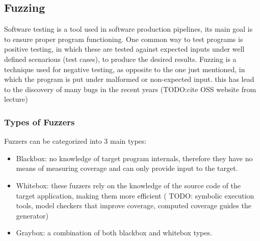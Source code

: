 





\subsection{Fuzzing}

Software testing is a tool used in software production pipelines, its main goal is to ensure proper program functioning. One common way to test programs is 
positive testing, in which these are tested against expected inputs under well defined scenarious (test cases), to produce the desired results.
Fuzzing is a technique used for negative testing, as opposite to the one just mentioned, in which the program is put under malformed or non-expected input. this
has lead to the discovery of many bugs in the recent years (TODO:\@ cite OSS website from lecture)

\subsubsection{Types of Fuzzers}
 
Fuzzers can be categorized into 3 main types\cite{fetzer20}:

\begin{itemize}
    \item Blackbox: no knowledge of target program internals, therefore they have no means of measuring coverage and can only provide input to the target.
    \item Whitebox: these fuzzers rely on the knowledge of the source code of the target application, making them more efficient ( TODO: symbolic execution tools, model checkers that improve coverage, computed coverage guides the generator)
    \item Graybox: a combination of both blackbox and whitebox types.
\end{itemize}


